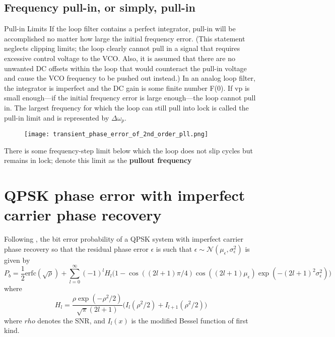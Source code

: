 \documentclass[a4paper]{article}
\begin{document}
\subsection{Frequency pull-in, or simply, pull-in}

Pull-in Limits If the loop filter contains a perfect integrator, pull-in will be accomplished no matter how large the initial frequency error. (This statement neglects clipping limits; the loop clearly cannot pull in a signal that requires excessive control voltage to the VCO. Also, it is assumed that there are no unwanted DC offsets within the loop that would counteract the pull-in voltage and cause the VCO frequency to be pushed out instead.) In an analog loop filter, the integrator is imperfect and the DC gain is some finite number F(0). If vp is small enough—if the initial frequency error is large enough—the loop cannot pull in. The largest frequency for which the loop can still pull into lock is called the pull-in limit and is represented by $\Delta\omega_p$.

\begin{figure}[h!]
	\centering
	\texttt{[image: transient\_phase\_error\_of\_2nd\_order\_pll.png]}
	\label{fig:transient_2nd_pll}
	\caption{\cite{Gardner}}
\end{figure}

There is some frequency-step limit below which the loop does not slip cycles but remains in lock; denote this limit as the \textbf{pullout frequency}


\section{QPSK phase error with imperfect carrier phase recovery}
Following \cite{Prabhu1976}, the bit error probability of a QPSK system with imperfect carrier phase recovery so that the residual phase error $\epsilon$ is such that $\epsilon \sim \mathcal{N}(\mu_\epsilon, \sigma_\epsilon^2)$ is given by
\begin{equation}
P_b = \frac{1}{2}\mathrm{erfc}(\sqrt{\rho}) + \sum_{l = 0}^\infty (-1)^lH_l\Big(1 - \cos((2l+1)\pi/4)\cos((2l+1)\mu_\epsilon)\exp(-(2l+1)^2\sigma_\epsilon^2)\Big)
\end{equation}
where
\begin{equation}
H_l = \frac{\rho\exp(-\rho^2/2)}{\sqrt{\pi}(2l+1)}\Big(I_l(\rho^2/2) + I_{l+1}(\rho^2/2)\Big)
\end{equation}
where $rho$ denotes the SNR, and $I_l(x)$ is the modified Bessel function of first kind.





\end{document}
